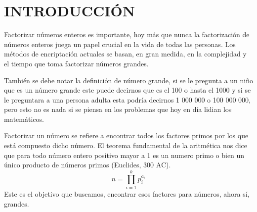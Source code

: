 \documentclass[12pt,letterpaper]{book}
\begin{document}
	\frontmatter %
	
% 	
% 	
	
	\tableofcontents
	\setcounter{page}{0}
	
	
	\mainmatter %
    
    
    \raggedbottom
    
    \chapter{INTRODUCCIÓN}


    \thispagestyle{empty}

    Factorizar números enteros es importante, hoy más que nunca la factorización de números enteros juega un papel crucial en la vida de todas las personas. Los métodos de encriptación actuales se basan, en gran medida, en la complejidad y el tiempo que toma factorizar números grandes.

    También se debe notar la definición de número grande, si se le pregunta a un niño que es un número grande este puede decirnos que es el 100 o hasta el 1000 y si se le preguntara a una persona adulta esta podría decirnos 1 000 000 o 100 000 000, pero esto no es nada si se piensa en los problemas que hoy en día lidian los matemáticos.

    Factorizar un número se refiere a encontrar todos los factores primos por los que está compuesto dicho número. El teorema fundamental de la aritmética nos dice que para todo número entero positivo mayor a 1 es un numero primo o bien un único producto de números primos (Euclides, 300 AC).
    \[
    n = \prod_{i=1}^{k}p_{i}^{a_{i}}
    \]
    Este es el objetivo que buscamos, encontrar esos factores para números, ahora sí, grandes.
\end{document}
